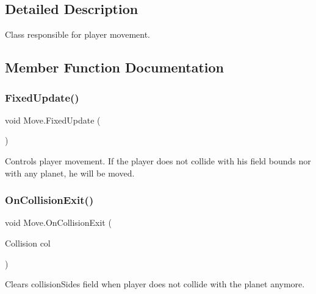 \subsection{Detailed Description}
Class responsible for player movement. 



\subsection{Member Function Documentation}
\mbox{\label{class_move_aa993ca0c0450f5ad56c7d09aaabb6832}} 
\subsubsection{\texorpdfstring{Fixed\+Update()}{FixedUpdate()}}
{\footnotesize\ttfamily void Move.\+Fixed\+Update (\begin{DoxyParamCaption}{ }\end{DoxyParamCaption})\hspace{0.3cm}{\ttfamily [private]}}



Controls player movement. If the player does not collide with his field bounds nor with any planet, he will be moved. 

\mbox{\label{class_move_a49017f3ca3f73afbff88f4b79fb89d37}} 
\subsubsection{\texorpdfstring{On\+Collision\+Exit()}{OnCollisionExit()}}
{\footnotesize\ttfamily void Move.\+On\+Collision\+Exit (\begin{DoxyParamCaption}\item[{Collision}]{col }\end{DoxyParamCaption})\hspace{0.3cm}{\ttfamily [private]}}



Clears collision\+Sides field when player does not collide with the planet anymore. 

\mbox{\label{class_move_ac2bfaf00595a43fa315564a9bf25dd91}} 
